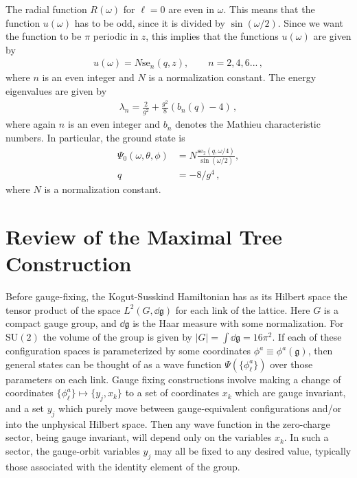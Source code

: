 \documentclass[reprint,superscriptaddress,pra,nofootinbib,preprintnumbers,floatfix]{revtex4-1}
\providecommand{\sutwo}{$\mathrm{SU}(2)$\xspace}
\providecommand{\g}{{\mathfrak{g}}}
\begin{document}
The radial function $R(\omega)$ for $\ell = 0$ are even in $\omega$. 
%
This means that the function $u(\omega)$ has to be odd, since it is divided by $\sin(\omega /2)$. 
%
Since we want the function to be $\pi$ periodic in $z$, this implies that the functions $u(\omega)$ are given by
%
\begin{align}
    u(\omega) = N \text{se}_n(q,z), \qquad n=2,4,6...
    \,,
\end{align}
%
where $n$ is an even integer and $N$ is a normalization constant. The energy eigenvalues are given by
%
\begin{align}
    \lambda_n = \frac{2}{g^2} + \frac{g^2}{8} \left( b_n(q) - 4\right)
    \,,
\end{align}
%
where again $n$ is an even integer and $b_n$ denotes the Mathieu characteristic numbers. 
%
In particular, the ground state is 
%
\begin{align}
    \Psi_0(\omega,\theta,\phi) &= N \frac{\text{se}_2(q,\omega/4)}{\sin(\omega/2)}, \nonumber\\
    q &= -8/g^4 \nonumber
    \,,
\end{align}
%
where $N$ is a normalization constant.

\section{Review of the Maximal Tree Construction}
\label{app:maxTree}

Before gauge-fixing, the Kogut-Susskind Hamiltonian has as its Hilbert space the tensor product of the space $L^2(G,\dd\g)$ for each link of the lattice. 
%
Here $G$ is a compact gauge group, and $\dd\g$ is the Haar measure with some normalization. 
%
For \sutwo the volume of the group is given by $|G| = \int \! \dd\g = 16\pi^2$.
%
If each of these configuration spaces is parameterized by some coordinates $\phi^a \equiv \phi^a(\g)$, then general states can be thought of as a wave function $\Psi(\{\phi^a_\ell\})$ over those parameters on each link. 
%
Gauge fixing constructions involve making a change of coordinates $\{\phi^a_\ell\} \mapsto \{y_j,x_k\}$ to a set of coordinates $x_k$ which are gauge invariant, and a set $y_j$ which purely move between gauge-equivalent configurations and/or into the unphysical Hilbert space. 
%
Then any wave function in the zero-charge sector, being gauge invariant, will depend only on the variables $x_k$. 
%
In such a sector, the gauge-orbit variables $y_j$ may all be fixed to any desired value, typically those associated with the identity element of the group.
\end{document}
